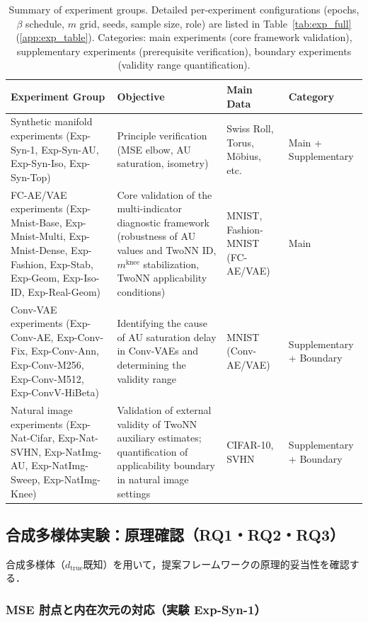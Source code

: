 \documentclass[11pt,a4paper]{jsarticle}
\newcommand{\dtrue}{d_{\mathrm{true}}}
\newcommand{\mknee}{m^{\mathrm{knee}}}
\begin{document}
\begin{table}[H]
\centering
\caption{Summary of experiment groups. Detailed per-experiment configurations (epochs, $\beta$ schedule, $m$ grid, seeds, sample size, role) are listed in Table~\ref{tab:exp_full} (\ref{app:exp_table}). Categories: main experiments (core framework validation), supplementary experiments (prerequisite verification), boundary experiments (validity range quantification).}
\label{tab:exp_list}
\small
\begin{tabular}{p{4.5cm}p{4.0cm}p{3.0cm}p{2.5cm}}
\toprule
Experiment Group & Objective & Main Data & Category \\
\midrule
Synthetic manifold experiments
(Exp-Syn-1, Exp-Syn-AU, Exp-Syn-Iso, Exp-Syn-Top)
  & Principle verification (MSE elbow, AU saturation, isometry)
  & Swiss Roll, Torus, Möbius, etc.
  & Main + Supplementary \\
\addlinespace
FC-AE/VAE experiments
(Exp-Mnist-Base, Exp-Mnist-Multi, Exp-Mnist-Dense, Exp-Fashion, Exp-Stab, Exp-Geom, Exp-Iso-ID, Exp-Real-Geom)
  & Core validation of the multi-indicator diagnostic framework (robustness of AU values and TwoNN ID, $\mknee$ stabilization, TwoNN applicability conditions)
  & MNIST, Fashion-MNIST (FC-AE/VAE)
  & Main \\
\addlinespace
Conv-VAE experiments
(Exp-Conv-AE, Exp-Conv-Fix, Exp-Conv-Ann, Exp-Conv-M256, Exp-Conv-M512, Exp-ConvV-HiBeta)
  & Identifying the cause of AU saturation delay in Conv-VAEs and determining the validity range
  & MNIST (Conv-AE/VAE)
  & Supplementary + Boundary \\
\addlinespace
Natural image experiments
(Exp-Nat-Cifar, Exp-Nat-SVHN, Exp-NatImg-AU, Exp-NatImg-Sweep, Exp-NatImg-Knee)
  & Validation of external validity of TwoNN auxiliary estimates; quantification of applicability boundary in natural image settings
  & CIFAR-10, SVHN
  & Supplementary + Boundary \\
\bottomrule
\end{tabular}
\end{table}

\subsection{合成多様体実験：原理確認（RQ1・RQ2・RQ3）}\label{sec:exp_synthetic}

合成多様体（$\dtrue$既知）を用いて，提案フレームワークの原理的妥当性を確認する．

\subsubsection{MSE 肘点と内在次元の対応（実験 Exp-Syn-1）}
\end{document}
